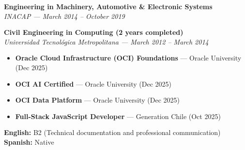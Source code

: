 \documentclass[10pt,letterpaper]{article}
\begin{document}
\vspace{0.3cm}

\noindent \textbf{Engineering in Machinery, Automotive \& Electronic Systems} \\
\textit{INACAP — March 2014 – October 2019}

\vspace{0.2cm}

\noindent \textbf{Civil Engineering in Computing (2 years completed)} \\
\textit{Universidad Tecnológica Metropolitana — March 2012 – March 2014}

\vspace{0.4cm}


\vspace{0.3cm}

\begin{itemize}
    \item \textbf{Oracle Cloud Infrastructure (OCI) Foundations} — Oracle University (Dec 2025)
    \item \textbf{OCI AI Certified} — Oracle University (Dec 2025)
    \item \textbf{OCI Data Platform} — Oracle University (Dec 2025)
    \item \textbf{Full-Stack JavaScript Developer} — Generation Chile (Oct 2025)
\end{itemize}

\vspace{0.4cm}


\vspace{0.3cm}

\noindent \textbf{English:} B2 (Technical documentation and professional communication) \\
\noindent \textbf{Spanish:} Native
\end{document}

